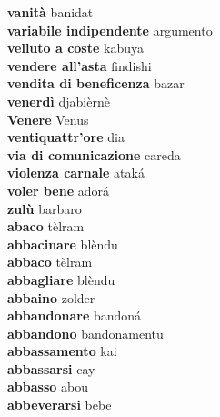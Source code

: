 \textbf{ vanità  } banidat \\
\textbf{ variabile indipendente  } argumento \\
\textbf{ velluto a coste  } kabuya \\
\textbf{ vendere all’asta  } findishi \\
\textbf{ vendita di beneficenza  } bazar \\
\textbf{ venerdì  } djabièrnè \\
\textbf{ Venere  } Venus \\
\textbf{ ventiquattr’ore  } dia \\
\textbf{ via di comunicazione  } careda \\
\textbf{ violenza carnale  } ataká \\
\textbf{ voler bene  } adorá \\
\textbf{ zulù  } barbaro \\
\textbf{abaco } tèlram \\
\textbf{abbacinare } blèndu \\
\textbf{abbaco } tèlram \\
\textbf{abbagliare } blèndu \\
\textbf{abbaino } zolder \\
\textbf{abbandonare } bandoná \\
\textbf{abbandono } bandonamentu \\
\textbf{abbassamento } kai \\
\textbf{abbassarsi } cay \\
\textbf{abbasso } abou \\
\textbf{abbeverarsi } bebe \\
